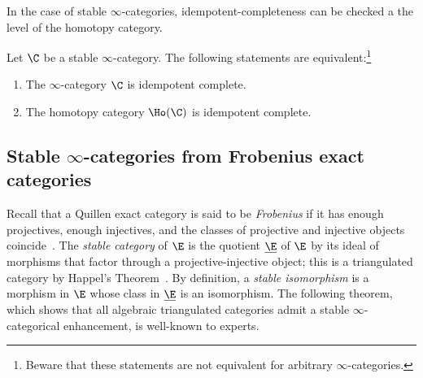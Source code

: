 \documentclass[a4paper]{amsart}
\begin{document}
In the case of stable $\infty$-categories, idempotent-completeness can be
checked a the level of the homotopy category.

\begin{proposition}
  Let $\C$ be a stable $\infty$-category. The following statements are
  equivalent:\footnote{Beware that these statements are not equivalent for
    arbitrary $\infty$-categories.}
  \begin{enumerate}
  \item The $\infty$-category $\C$ is idempotent complete.
  \item The homotopy category $\Ho(\C)$ is idempotent complete.
  \end{enumerate}
\end{proposition}

\subsection{Stable $\infty$-categories from Frobenius exact categories}

Recall that a Quillen exact category is said to be \emph{Frobenius} if it has
enough projectives, enough injectives, and the classes of projective and
injective objects coincide~\cite[Section~I.2]{Hap88}. The \emph{stable category}
of $\E$ is the quotient $\underline{\E}$ of $\E$ by its ideal of morphisms that factor through a
projective-injective object; this is a triangulated category by Happel's
Theorem~\cite[Theorem~I.2.6]{Hap88}. By definition, a \emph{stable isomorphism}
is a morphism in $\E$ whose class in $\underline{\E}$ is an isomorphism. The
following theorem, which shows that all algebraic triangulated categories admit
a stable $\infty$-categorical enhancement, is well-known to experts.
\end{document}
